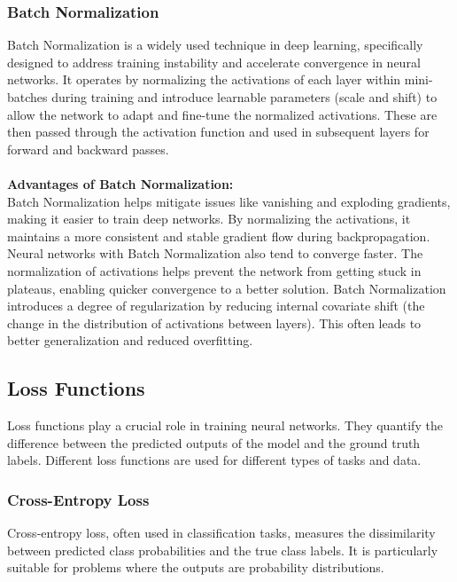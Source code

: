 \subsubsection{Batch Normalization}

Batch Normalization is a widely used technique in deep learning, specifically designed to address training instability and accelerate convergence in neural networks. It operates by normalizing the activations of each layer within mini-batches during training and introduce learnable parameters (scale and shift) to allow the network to adapt and fine-tune the normalized activations.
These are then passed through the activation function and used in subsequent layers for forward and backward passes.
\\ \\
\textbf{Advantages of Batch Normalization:} \\
Batch Normalization helps mitigate issues like vanishing and exploding gradients, making it easier to train deep networks. By normalizing the activations, it maintains a more consistent and stable gradient flow during backpropagation.
Neural networks with Batch Normalization also tend to converge faster. The normalization of activations helps prevent the network from getting stuck in plateaus, enabling quicker convergence to a better solution.
Batch Normalization introduces a degree of regularization by reducing internal covariate shift (the change in the distribution of activations between layers). This often leads to better generalization and reduced overfitting. \cite{batchnormexp}


\subsection{Loss Functions} \label{loss}

Loss functions play a crucial role in training neural networks. They quantify the difference between the predicted outputs of the model and the ground truth labels. Different loss functions are used for different types of tasks and data.

\subsubsection{Cross-Entropy Loss} \label{sec:crossentropy}

Cross-entropy loss, often used in classification tasks, measures the dissimilarity between predicted class probabilities and the true class labels. It is particularly suitable for problems where the outputs are probability distributions.

